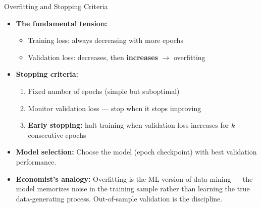 \documentclass[10pt,english,aspectratio=169]{beamer}
\begin{document}
\begin{frame}{Overfitting and Stopping Criteria}
\begin{itemize}
\item \textbf{The fundamental tension:}
\begin{itemize}
\item Training loss: always decreasing with more epochs
\item Validation loss: decreases, then \textbf{increases} $\to$ overfitting
\end{itemize}

\medskip
\item \textbf{Stopping criteria:}
\begin{enumerate}
\item Fixed number of epochs (simple but suboptimal)
\item Monitor validation loss --- stop when it stops improving
\item \textbf{Early stopping:} halt training when validation loss increases for $k$ consecutive epochs
\end{enumerate}

\medskip
\item \textbf{Model selection:} Choose the model (epoch checkpoint) with best validation performance.

\medskip
\item \textbf{Economist's analogy:} Overfitting is the ML version of data mining --- the model memorizes noise in the training sample rather than learning the true data-generating process. Out-of-sample validation is the discipline.
\end{itemize}
\end{frame}
\end{document}
